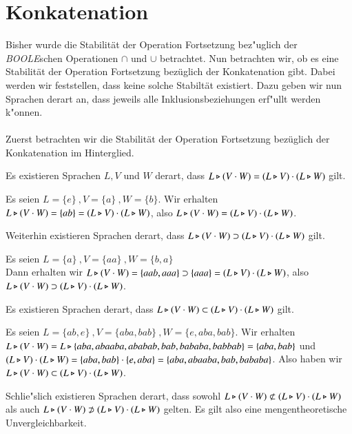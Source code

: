 \section{Konkatenation}
Bisher wurde die Stabilität der Operation Fortsetzung bez"uglich der \emph{BOOLE}schen Operationen $\cap$ und $\cup$ betrachtet.
Nun betrachten wir, ob es eine Stabilität der Operation Fortsetzung bezüglich der Konkatenation gibt.
Dabei werden wir feststellen, dass keine solche Stabiltät existiert. Dazu geben wir nun Sprachen derart an, dass jeweils alle Inklusionsbeziehungen erf"ullt werden k"onnen.\\\\
Zuerst betrachten wir die Stabilität der Operation Fortsetzung bezüglich der Konkatenation im Hinterglied.

Es existieren Sprachen $L,V$ und $W$ derart, dass $L\triangleright (V\cdot W) = (L\triangleright V) \cdot (L\triangleright W)$ gilt.

\vspace{2ex}

\begin{beispiel}
Es seien  $L=\{e\}\ ,V=\{a\}\ ,W=\{b\} $. Wir erhalten \\
$L\triangleright (V\cdot W) = \{ ab\} = (L\triangleright V) \cdot (L\triangleright W)$, also $L\triangleright (V\cdot W) = (L\triangleright V) \cdot (L\triangleright W)$.
\end{beispiel}
Weiterhin existieren Sprachen derart, dass $L\triangleright (V\cdot W) \supset (L\triangleright V) \cdot (L\triangleright W)$ gilt.

\vspace{2ex}

\begin{beispiel}
Es seien $L=\{a\}\ ,V=\{aa\}\ ,W=\{b,a\} $\\
Dann erhalten wir $L\triangleright (V\cdot W) = \{aab,aaa\} \supset  \{aaa\} = (L\triangleright V) \cdot (L\triangleright W)$, also $L\triangleright (V\cdot W) \supset (L\triangleright V) \cdot (L\triangleright W)$.
\end{beispiel}
Es existieren Sprachen derart, dass $L\triangleright (V\cdot W) \subset (L\triangleright V)\cdot (L\triangleright W)$ gilt.

\vspace{2ex}

\begin{beispiel}
Es seien  $L=\{ab,e\}\ ,V=\{aba,bab\}\ ,W=\{e,aba,bab\} $. Wir erhalten \\
$L\triangleright (V\cdot W) = L \triangleright \{aba,abaaba,ababab,bab,bababa,babbab\} = \{ aba,bab\}$ und $(L\triangleright V)\cdot (L\triangleright W) = \{aba,bab\} \cdot \{e,aba\} = \{aba,abaaba,bab,bababa\}$. 
Also haben wir $L\triangleright (V\cdot W) \subset (L\triangleright V)\cdot (L\triangleright W)$.
\end{beispiel}
Schlie"slich existieren Sprachen derart, dass sowohl $L\triangleright (V\cdot W) \not\subset (L\triangleright V)\cdot (L\triangleright W)$ als auch $L\triangleright (V\cdot W) \not\supset (L\triangleright V)\cdot (L\triangleright W)$ gelten. Es gilt also eine mengentheoretische Unvergleichbarkeit.

